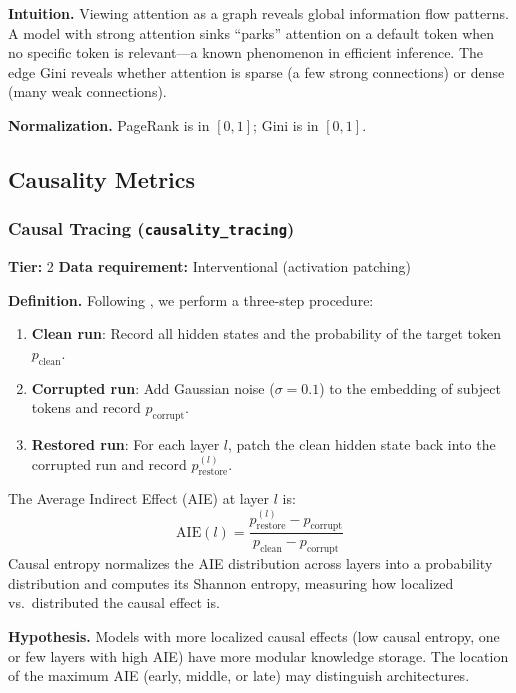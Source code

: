 \documentclass{article}
\begin{document}
\textbf{Intuition.}
Viewing attention as a graph reveals global information flow patterns. A model with strong attention sinks ``parks'' attention on a default token when no specific token is relevant---a known phenomenon in efficient inference. The edge Gini reveals whether attention is sparse (a few strong connections) or dense (many weak connections).

\textbf{Normalization.} PageRank is in $[0, 1]$; Gini is in $[0, 1]$.

\subsection{Causality Metrics}
\label{app:causality}

\subsubsection{Causal Tracing (\texttt{causality\_tracing})}
\label{app:tracing}

\textbf{Tier:} 2 \quad \textbf{Data requirement:} Interventional (activation patching)

\textbf{Definition.}
Following \citet{meng2022locating}, we perform a three-step procedure:
\begin{enumerate}
  \item \textbf{Clean run}: Record all hidden states and the probability of the target token $p_{\text{clean}}$.
  \item \textbf{Corrupted run}: Add Gaussian noise ($\sigma = 0.1$) to the embedding of subject tokens and record $p_{\text{corrupt}}$.
  \item \textbf{Restored run}: For each layer $l$, patch the clean hidden state back into the corrupted run and record $p_{\text{restore}}^{(l)}$.
\end{enumerate}
The Average Indirect Effect (AIE) at layer $l$ is:
\begin{equation}
  \text{AIE}(l) = \frac{p_{\text{restore}}^{(l)} - p_{\text{corrupt}}}{p_{\text{clean}} - p_{\text{corrupt}}}
\end{equation}
Causal entropy normalizes the AIE distribution across layers into a probability distribution and computes its Shannon entropy, measuring how localized vs.\ distributed the causal effect is.

\textbf{Hypothesis.}
Models with more localized causal effects (low causal entropy, one or few layers with high AIE) have more modular knowledge storage. The location of the maximum AIE (early, middle, or late) may distinguish architectures.
\end{document}
